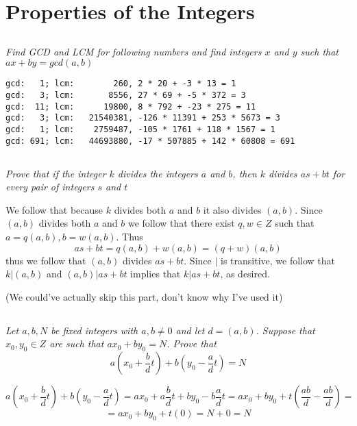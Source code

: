 \documentclass[11pt,oneside,titlepage]{book}
\begin{document}
\section{Properties of the Integers}

\subsection{}

\textit{Find GCD and LCM for following numbers and find integers $x$ and $y$ such that
  $ax + by = gcd(a, b)$}

\begin{verbatim}
gcd:   1; lcm:        260, 2 * 20 + -3 * 13 = 1
gcd:   3; lcm:       8556, 27 * 69 + -5 * 372 = 3
gcd:  11; lcm:      19800, 8 * 792 + -23 * 275 = 11
gcd:   3; lcm:   21540381, -126 * 11391 + 253 * 5673 = 3
gcd:   1; lcm:    2759487, -105 * 1761 + 118 * 1567 = 1
gcd: 691; lcm:   44693880, -17 * 507885 + 142 * 60808 = 691
\end{verbatim}

\subsection{}

\textit{Prove that if the integer $k$ divides the integers $a$ and $b$, then $k$ divides
  $as + bt$ for every pair of integers $s$ and $t$}

We follow that because $k$ divides both $a$ and $b$ it also divides $(a, b)$.
Since $(a, b)$ divides both $a$ and $b$ we follow that there exist $q, w \in Z$ such that
$a = q(a, b), b = w(a, b)$.
Thus
$$as + bt = q(a, b) + w(a, b) = (q + w) (a, b)$$
thus we follow that $(a, b)$ divides $as + bt$. Since $|$ is transitive, we follow that
$k | (a, b)$ and $(a, b)| as + bt$ implies that $k | as + bt$, as desired.

(We could've actually skip this part, don't know why I've used it)

\subsection{}

\textit{Let $a, b, N$ be fixed integers with $a, b \neq 0$ and let $d = (a, b)$. Suppose that
  $x_0, y_0 \in Z$ are such that $ax_0 + by_0 = N$. Prove that
  $$a(x_0 + \frac{b}{d}t) + b(y_0 - \frac{a}{d}t) = N$$
}

$$a(x_0 + \frac{b}{d}t) + b(y_0 - \frac{a}{d}t) =
a x_0 + a \frac{b}{d}t + by_0 - b\frac{a}{d}t =
a x_0 + by_0 + t( \frac{ab}{d} - \frac{ab}{d}) =$$
$$ = 
a x_0 + by_0 + t( 0) =
N + 0 = N
$$
\end{document}
